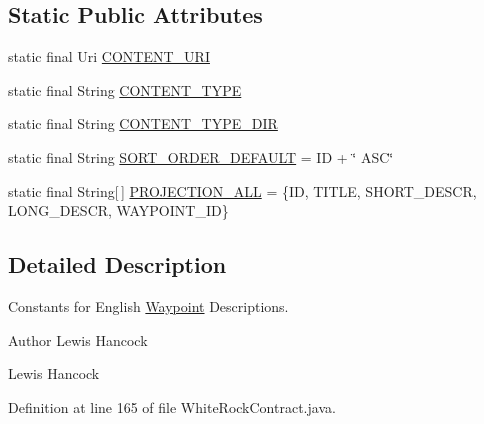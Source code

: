 \subsection*{Static Public Attributes}
\begin{DoxyCompactItemize}
\item 
static final Uri \hyperlink{classuk_1_1ac_1_1swan_1_1digitaltrails_1_1database_1_1_white_rock_contract_1_1_english_waypoint_descriptions_a4ed68a49659b074ba15056a0e4b740ca}{C\+O\+N\+T\+E\+N\+T\+\_\+\+U\+R\+I}
\item 
static final String \hyperlink{classuk_1_1ac_1_1swan_1_1digitaltrails_1_1database_1_1_white_rock_contract_1_1_english_waypoint_descriptions_ab96f056029af68004fd9bbc3b194046c}{C\+O\+N\+T\+E\+N\+T\+\_\+\+T\+Y\+P\+E}
\item 
static final String \hyperlink{classuk_1_1ac_1_1swan_1_1digitaltrails_1_1database_1_1_white_rock_contract_1_1_english_waypoint_descriptions_ab7a08b8fb571368223c6d9faf5bf28ce}{C\+O\+N\+T\+E\+N\+T\+\_\+\+T\+Y\+P\+E\+\_\+\+D\+I\+R}
\item 
static final String \hyperlink{classuk_1_1ac_1_1swan_1_1digitaltrails_1_1database_1_1_white_rock_contract_1_1_english_waypoint_descriptions_aabc34e09898c7fc546eed2c1aef2794e}{S\+O\+R\+T\+\_\+\+O\+R\+D\+E\+R\+\_\+\+D\+E\+F\+A\+U\+L\+T} = I\+D + \char`\"{} A\+S\+C\char`\"{}
\item 
static final String\mbox{[}$\,$\mbox{]} \hyperlink{classuk_1_1ac_1_1swan_1_1digitaltrails_1_1database_1_1_white_rock_contract_1_1_english_waypoint_descriptions_a5c5f38960c74e8abe7716f2c8703cf79}{P\+R\+O\+J\+E\+C\+T\+I\+O\+N\+\_\+\+A\+L\+L} = \{I\+D, T\+I\+T\+L\+E, S\+H\+O\+R\+T\+\_\+\+D\+E\+S\+C\+R, L\+O\+N\+G\+\_\+\+D\+E\+S\+C\+R, W\+A\+Y\+P\+O\+I\+N\+T\+\_\+\+I\+D\}
\end{DoxyCompactItemize}


\subsection{Detailed Description}
Constants for English \hyperlink{classuk_1_1ac_1_1swan_1_1digitaltrails_1_1database_1_1_white_rock_contract_1_1_waypoint}{Waypoint} Descriptions. 

\begin{DoxyAuthor}{Author}
Lewis Hancock 

Lewis Hancock 
\end{DoxyAuthor}


Definition at line 165 of file White\+Rock\+Contract.\+java.



